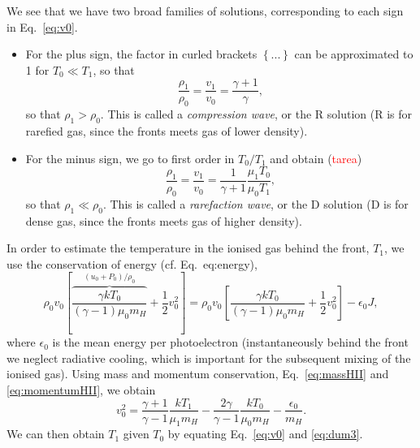 \begin{frame}{}


We see that we have two broad families of solutions, corresponding to
each sign in Eq.~\ref{eq:v0}. 
\begin{itemize}
\item For the plus sign, the factor in curled brackets $\left\{
... \right\}$ can be approximated to 1 for $T_0 \ll T_1$, so that 
\[ 
\frac{\rho_1}{\rho_0} = \frac{v_1}{v_0} = \frac{\gamma + 1}{\gamma}, 
\] 
so that $\rho_1 > \rho_0$. This is called a {\em compression wave}, or
the R solution (R is for rarefied gas, since the fronts meets gas of
lower density). 

\item For the minus sign, we go to first order in $T_0/T_1$ and obtain 
(\textcolor{red}{tarea})
\[ 
\frac{\rho_1}{\rho_0} = \frac{v_1}{v_0} = \frac{1}{\gamma + 1}
\frac{\mu_1 T_0}{\mu_0 T_1},
\] 
so that $\rho_1 \ll \rho_0$. This is called a {\em rarefaction wave},
or the D solution (D is for dense gas, since the fronts meets gas of
higher density).
\end{itemize}

\end{frame}






\begin{frame}{}

In order to estimate the temperature in the ionised gas behind the
front, $T_1$, we use the conservation of energy (cf. Eq.~{eq:energy}),
\begin{equation}
\rho_0 v_0 \left[ \overbrace{\frac{ \gamma k T_0 } {(\gamma - 1) \mu_0
      m_H}}^{ (u_0 + P_0 ) / \rho_0  } +
  \frac{1}{2}v_0^2 \right]  =
 \rho_0 v_0 \left[ \frac{ \gamma k T_0 } {(\gamma - 1) \mu_0 m_H} +
  \frac{1}{2}v_0^2 \right]  - \epsilon_0 J,
\end{equation}
where $\epsilon_0$ is the mean energy per photoelectron
(instantaneously behind the front we neglect radiative cooling, which
is important for the subsequent mixing of the ionised gas). Using mass
and momentum conservation, Eq.~\ref{eq:massHII} and
\ref{eq:momentumHII}, we obtain
\begin{equation}
v_0^2 = \frac{\gamma + 1}{\gamma -1 } \frac{k T_1 }{\mu_1 m_H} - 
\frac{2 \gamma}{\gamma - 1} \frac{ k T_0}{\mu_0 m_H} -
\frac{\epsilon_0}{m_H}.  \label{eq:dum3}
\end{equation}
We can then obtain $T_1$ given $T_0$ by equating Eq.~\ref{eq:v0} and
\ref{eq:dum3}. 

\end{frame}




